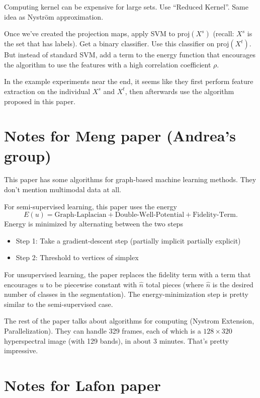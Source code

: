 \documentclass{article}[11pt]
\begin{document}
Computing kernel can be expensive for large sets. Use ``Reduced Kernel''. Same
idea as Nystr\"{o}m approximation.

Once we've created the projection maps, apply SVM to $\text{proj}(X^s)$ (recall:
$X^s$ is the set that has labels). Get a binary classifier. Use this classifier
on $\text{proj}(X^t)$. But instead of standard SVM, add a term to the energy
function that encourages the algorithm to use the features with a high
correlation coefficient $\rho$.
 
In the example experiments near the end, it seems like they first perform
feature extraction on the individual $X^s$ and $X^t$, then afterwards use the
algorithm proposed in this paper.

\section{Notes for Meng paper \cite{Meng17} (Andrea's group)}

This paper has some algorithms for graph-based machine learning methods. They
don't mention multimodal data at all.

For semi-supervised learning, this paper uses the energy
\[E(u) = \text{Graph-Laplacian} + \text{Double-Well-Potential} +
  \text{Fidelity-Term}.\] Energy is minimized by alternating between the two
steps
\begin{itemize}
\item Step 1: Take a gradient-descent step (partially implicit partially
  explicit)
\item Step 2: Threshold to vertices of simplex
\end{itemize}

For unsupervised learning, the paper replaces the fidelity term with a term that
encourages $u$ to be piecewise constant with $\hat{n}$ total pieces (where
$\hat{n}$ is the desired number of classes in the segmentation). The
energy-minimization step is pretty similar to the semi-supervised case.

The rest of the paper talks about algorithms for computing (Nystrom Extension,
Parallelization). They can handle 329 frames, each of which is a $128\times 320$
hyperspectral image (with 129 bands), in about 3 minutes. That's pretty
impressive.

\section{Notes for Lafon paper \cite{Lafon06}}
\end{document}
